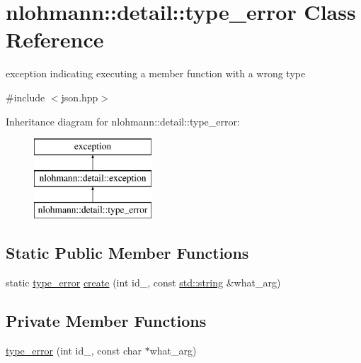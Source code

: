 \hypertarget{classnlohmann_1_1detail_1_1type__error}{}\section{nlohmann\+::detail\+::type\+\_\+error Class Reference}
\label{classnlohmann_1_1detail_1_1type__error}


exception indicating executing a member function with a wrong type  




{\ttfamily \#include $<$json.\+hpp$>$}

Inheritance diagram for nlohmann\+::detail\+::type\+\_\+error\+:\begin{figure}[H]
\begin{center}
\leavevmode
\includegraphics[height=3.000000cm]{da/d1c/classnlohmann_1_1detail_1_1type__error}
\end{center}
\end{figure}
\subsection*{Static Public Member Functions}
\begin{DoxyCompactItemize}
\item 
static \mbox{\hyperlink{classnlohmann_1_1detail_1_1type__error}{type\+\_\+error}} \mbox{\hyperlink{classnlohmann_1_1detail_1_1type__error_aecc083aea4b698c33d042670ba50c10f}{create}} (int id\+\_\+, const \mbox{\hyperlink{namespacenlohmann_1_1detail_a1ed8fc6239da25abcaf681d30ace4985ab45cffe084dd3d20d928bee85e7b0f21}{std\+::string}} \&what\+\_\+arg)
\end{DoxyCompactItemize}
\subsection*{Private Member Functions}
\begin{DoxyCompactItemize}
\item 
\mbox{\hyperlink{classnlohmann_1_1detail_1_1type__error_aa01edaa0bf18b853368f0b900e485cd7}{type\+\_\+error}} (int id\+\_\+, const char $\ast$what\+\_\+arg)
\end{DoxyCompactItemize}
